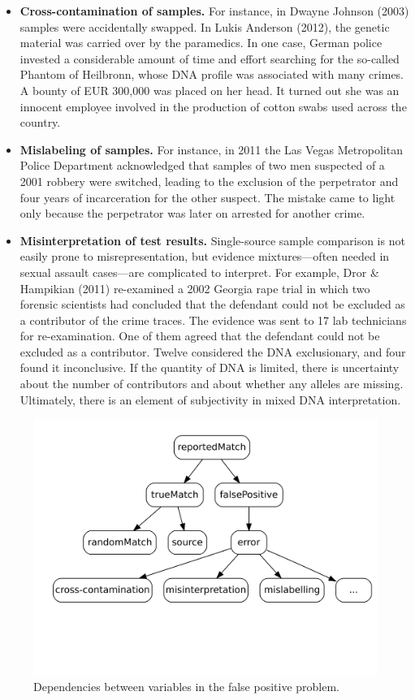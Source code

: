 \documentclass[
  10pt,
  dvipsnames,enabledeprecatedfontcommands]{scrartcl}
\begin{document}
\begin{itemize}
\item
  \textbf{Cross-contamination of samples.} For instance, in Dwayne
  Johnson (2003) samples were accidentally swapped. In Lukis Anderson
  (2012), the genetic material was carried over by the paramedics. In
  one case, German police invested a considerable amount of time and
  effort searching for the so-called Phantom of Heilbronn, whose DNA
  profile was associated with many crimes. A bounty of EUR 300,000 was
  placed on her head. It turned out she was an innocent employee
  involved in the production of cotton swabs used across the country.
\item
  \textbf{Mislabeling of samples.} For instance, in 2011 the Las Vegas
  Metropolitan Police Department acknowledged that samples of two men
  suspected of a 2001 robbery were switched, leading to the exclusion of
  the perpetrator and four years of incarceration for the other suspect.
  The mistake came to light only because the perpetrator was later on
  arrested for another crime.
\item
  \textbf{Misinterpretation of test results.} Single-source sample
  comparison is not easily prone to misrepresentation, but evidence
  mixtures---often needed in sexual assault cases---are complicated to
  interpret. For example, Dror \& Hampikian (2011) re-examined a 2002
  Georgia rape trial in which two forensic scientists had concluded that
  the defendant could not be excluded as a contributor of the crime
  traces. The evidence was sent to 17 lab technicians for
  re-examination. One of them agreed that the defendant could not be
  excluded as a contributor. Twelve considered the DNA exclusionary, and
  four found it inconclusive. If the quantity of DNA is limited, there
  is uncertainty about the number of contributors and about whether any
  alleles are missing. Ultimately, there is an element of subjectivity
  in mixed DNA interpretation.
\end{itemize}

\begin{center}
\begin{figure}
\includegraphics[width = 12cm]{img/fpp.png}
\caption{Dependencies between variables in the false positive problem.}
\label{fig:fpp}
\end{figure}
\end{center}
\end{document}
